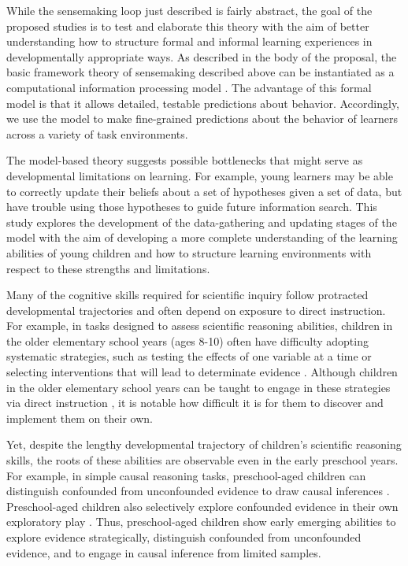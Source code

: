 \documentclass[10pt,letterpaper]{article}
\begin{document}
While the sensemaking loop just described is fairly abstract, the goal of the proposed studies is to test and elaborate this theory with the aim of better understanding how to structure formal and informal learning experiences in developmentally appropriate ways. As described in the body of the proposal, the basic framework theory of sensemaking described above can be instantiated as a computational information processing model \cite{Gureckis:2012,Gureckis:2009,Markant:2012}. The advantage of this formal model is that it allows detailed, testable predictions about behavior. Accordingly, we use the model to make fine-grained predictions about the behavior of learners across a variety of task environments.

The model-based theory suggests possible bottlenecks that might serve as developmental limitations on learning. For example, young learners may be able to correctly update their beliefs about a set of hypotheses given a set of data, but have trouble using those hypotheses to guide future information search. This study explores the development of the data-gathering and updating stages of the model with the aim of developing a more complete understanding of the learning abilities of young children and how to structure learning environments with respect to these strengths and limitations.

Many of the cognitive skills required for scientific inquiry follow protracted developmental trajectories and often depend on exposure to direct instruction. For example, in tasks designed to assess scientific reasoning abilities, children in the older elementary school years (ages 8-10) often have difficulty adopting systematic strategies, such as testing the effects of one variable at a time or selecting interventions that will lead to determinate evidence \cite{Chen:1999}. Although children in the older elementary school years can be taught to engage in these strategies via direct instruction \cite{Klahr:2004,Kuhn:2005}, it is notable how difficult it is for them to discover and implement them on their own.

Yet, despite the lengthy developmental trajectory of children's scientific reasoning skills, the roots of these abilities are observable even in the early preschool years. For example, in simple causal reasoning tasks, preschool-aged children can distinguish confounded from unconfounded evidence to draw causal inferences \cite{Gopnik:2001,Kushnir:2005,Kushnir:2007,Schulz:2004}. Preschool-aged children also selectively explore confounded evidence in their own exploratory play \cite{Cook:2011,Gweon:2008,Schulz:2007}. Thus, preschool-aged children show early emerging abilities to explore evidence strategically, distinguish confounded from unconfounded evidence, and to engage in causal inference from limited samples.
\end{document}
